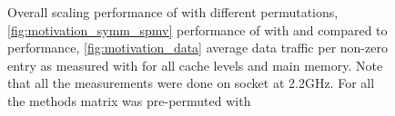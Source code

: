   \begin{figure}[thbp]
  	\centering
  	\hspace{1em}
    \hspace{1em}
  	
  	\caption{ Overall scaling performance of \SpMV with different permutations, \cref{fig:motivation_symm_spmv} performance of \SymmSpmv with \MC and \ABMC compared to \SpMV performance, \cref{fig:motivation_data} average data traffic per non-zero entry as measured with \LIKWID for all cache levels and main memory. Note that all the measurements were done on \IVB socket at 2.2GHz. For all the methods matrix was pre-permuted with \RCM }
  	\label{fig:motivation}
  \end{figure}
 
